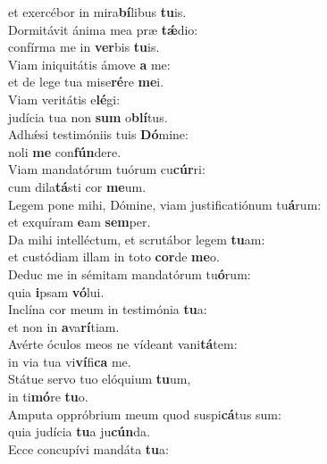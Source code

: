 \oddverse et exercébor in mira\textbf{bí}libus \textbf{tu}is.\\
\evenverse Dormitávit ánima mea præ \textbf{tǽ}dio:~\*\\
\evenverse confírma me in \textbf{ver}bis \textbf{tu}is.\\
\oddverse Viam iniquitátis ámove \textbf{a} me:~\*\\
\oddverse et de lege tua mise\textbf{ré}re \textbf{me}i.\\
\evenverse Viam veritátis e\textbf{lé}gi:~\*\\
\evenverse judícia tua non \textbf{sum} o\textbf{blí}tus.\\
\oddverse Adhǽsi testimóniis tuis \textbf{Dó}mine:~\*\\
\oddverse noli \textbf{me} con\textbf{fún}dere.\\
\evenverse Viam mandatórum tuórum cu\textbf{cúr}ri:~\*\\
\evenverse cum dila\textbf{tá}sti cor \textbf{me}um.\\
\oddverse Legem pone mihi, Dómine, viam justificatiónum tu\textbf{á}rum:~\*\\
\oddverse et exquíram \textbf{e}am \textbf{sem}per.\\
\evenverse Da mihi intelléctum, et scrutábor legem \textbf{tu}am:~\*\\
\evenverse et custódiam illam in toto \textbf{cor}de \textbf{me}o.\\
\oddverse Deduc me in sémitam mandatórum tu\textbf{ó}rum:~\*\\
\oddverse quia \textbf{i}psam \textbf{vó}lui.\\
\evenverse Inclína cor meum in testimónia \textbf{tu}a:~\*\\
\evenverse et non in \textbf{a}va\textbf{rí}tiam.\\
\oddverse Avérte óculos meos ne vídeant vani\textbf{tá}tem:~\*\\
\oddverse in via tua vi\textbf{ví}fi\textbf{ca} me.\\
\evenverse Státue servo tuo elóquium \textbf{tu}um,~\*\\
\evenverse in ti\textbf{mó}re \textbf{tu}o.\\
\oddverse Amputa oppróbrium meum quod suspi\textbf{cá}tus sum:~\*\\
\oddverse quia judícia \textbf{tu}a ju\textbf{cún}da.\\
\evenverse Ecce concupívi mandáta \textbf{tu}a:~\*\\
